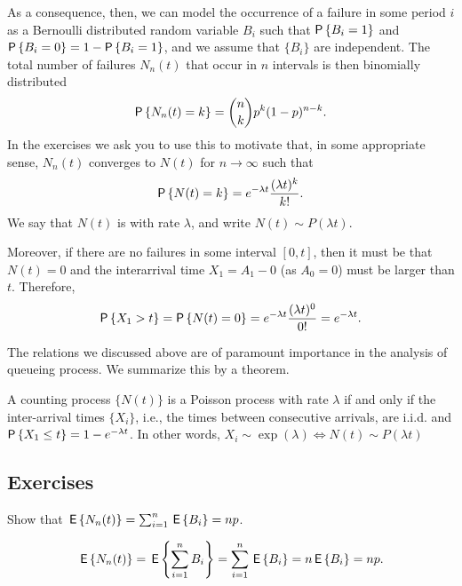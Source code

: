 As a consequence, then, we can model the occurrence of a failure in
some period $i$ as a Bernoulli distributed random variable $B_i$ such
that $\P{B_i =1}$ and $\P{B_i=0} = 1-\P{B_i = 1}$, and we assume that
$\{B_i\}$ are independent. The total number of failures $N_n(t)$ that
occur in $n$ intervals is then binomially distributed
\begin{equation}\label{eq:bin}
  \P{N_n(t) = k} = {n \choose k} p^k (1-p)^{n-k}.
\end{equation}
In the exercises we ask you to use this to motivate that, in some
appropriate sense, $N_n(t)$ converges to $N(t)$ for $n\to \infty$ such
that
\begin{equation}\label{eq:pois}
  \P{N(t) = k} = 
e^{-\lambda t} \frac{(\lambda t)^k}{k!}.
\end{equation}
We say that $N(t)$ is  with rate
$\lambda$, and write $N(t)\sim P(\lambda t)$. 

Moreover, if there are no failures in some interval $[0,t]$, then it
must be that $N(t) = 0$ and the interarrival time $X_1=A_1-0$ (as
$A_0=0$) must be larger than $t$.  Therefore,
\begin{equation*}
 \P{X_1> t} = \P{N(t) = 0} = e^{-\lambda t} \frac{(\lambda t)^0}{0!}= e^{-\lambda t}.
\end{equation*}

The relations we discussed above are of paramount importance in the
analysis of queueing process. We summarize this by a theorem.
\begin{theorem}\label{thr:1}
  A counting process $\{N(t)\}$ is a Poisson process with rate $\lambda$ if and only if
  the inter-arrival times $\{X_i\}$, i.e., the times between consecutive
  arrivals, are i.i.d. and $\P{ X_1\leq t} = 1 - e^{-\lambda t}$. In other words, $X_i\sim \exp(\lambda) \Leftrightarrow N(t) \sim P(\lambda t)$ 
\end{theorem}

\subsection*{Exercises}


\begin{question}
Show that $\,\mathsf{E}\left\{N_n(t)\right\} = \sum_{i=1}^n \,\mathsf{E}\left\{B_i\right\} = n p$.
\begin{hint}
\end{hint}
\begin{solution}
  \begin{equation*}
    \,\mathsf{E}\left\{N_n(t)\right\} = \,\mathsf{E}\left\{\sum_{i=1}^n {B_i}\right\} = \sum_{i=1}^n \,\mathsf{E}\left\{B_i\right\} = n \,\mathsf{E}\left\{B_i\right\} = n p.
  \end{equation*}
\end{solution}
\end{question}


